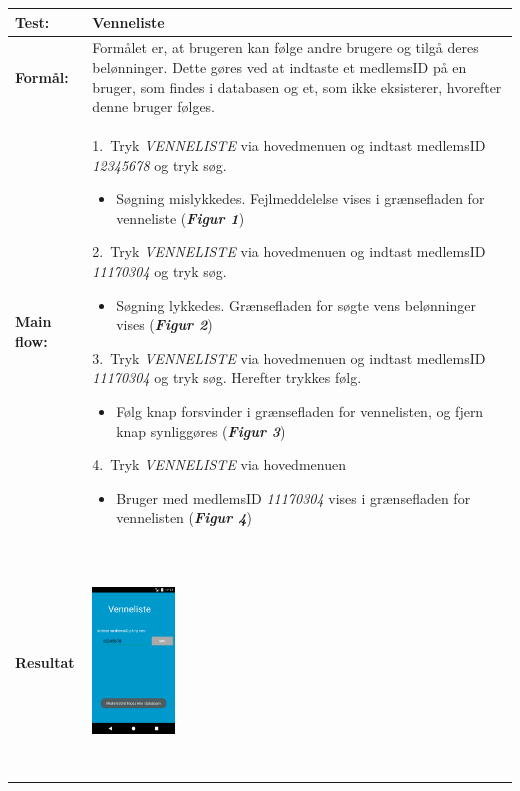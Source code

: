   \begin{longtable}{ | l | p{13cm} |} \hline
    \textbf{Test:} & Venneliste \\ \hline
  \textbf{Formål:} & Formålet er, at brugeren kan følge andre brugere og tilgå deres belønninger. Dette gøres ved at indtaste et medlemsID på en bruger, som findes i databasen og et, som ikke eksisterer, hvorefter denne bruger følges.
 \\ \hline
 	\textbf{Main flow:} & 1.~Tryk \textit{VENNELISTE} via hovedmenuen og indtast medlemsID \textit{12345678} og tryk søg.  
 	\begin{itemize}
 	\item Søgning mislykkedes. Fejlmeddelelse vises i grænsefladen for venneliste (\textbf{\textit{Figur 1}})
 	\end{itemize}	
 	2.~Tryk \textit{VENNELISTE} via hovedmenuen og indtast medlemsID \textit{11170304} og tryk søg.
 	\begin{itemize}
 	\item Søgning lykkedes. Grænsefladen for søgte vens belønninger vises (\textbf{\textit{Figur 2}})
	\end{itemize}
  3.~Tryk \textit{VENNELISTE} via hovedmenuen og indtast medlemsID \textit{11170304} og tryk søg. Herefter trykkes følg.
  \begin{itemize}
  \item  Følg knap forsvinder i grænsefladen for vennelisten, og fjern knap synliggøres (\textbf{\textit{Figur 3}})
  \end{itemize}
  4.~Tryk \textit{VENNELISTE} via hovedmenuen
  \begin{itemize}
  \item Bruger med medlemsID \textit{11170304} vises i grænsefladen for vennelisten (\textbf{\textit{Figur 4}})
  \end{itemize} \hspace{0.2mm}\\ \hline
\textbf{Resultat} & \hspace{0.3mm} \raisebox{-\totalheight}    {\includegraphics[width=0.20\textwidth, height=60mm]{figures/test/vennelisteny}} 

\end{longtable}
